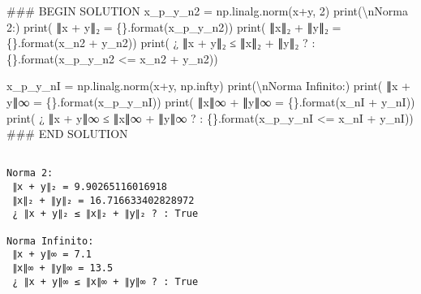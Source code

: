 \documentclass[
  letterpaper,
  DIV=11,
  numbers=noendperiod]{scrreprt}
\newenvironment{Shaded}{\begin{snugshade}}{\end{snugshade}}
\newcommand{\BuiltInTok}[1]{\textcolor[rgb]{0.00,0.23,0.31}{#1}}
\newcommand{\CharTok}[1]{\textcolor[rgb]{0.13,0.47,0.30}{#1}}
\newcommand{\CommentTok}[1]{\textcolor[rgb]{0.37,0.37,0.37}{#1}}
\newcommand{\DecValTok}[1]{\textcolor[rgb]{0.68,0.00,0.00}{#1}}
\newcommand{\NormalTok}[1]{\textcolor[rgb]{0.00,0.23,0.31}{#1}}
\newcommand{\OperatorTok}[1]{\textcolor[rgb]{0.37,0.37,0.37}{#1}}
\newcommand{\RegionMarkerTok}[1]{\textcolor[rgb]{0.00,0.23,0.31}{#1}}
\newcommand{\SpecialCharTok}[1]{\textcolor[rgb]{0.37,0.37,0.37}{#1}}
\newcommand{\StringTok}[1]{\textcolor[rgb]{0.13,0.47,0.30}{#1}}
\begin{document}
\begin{Shaded}
\begin{Highlighting}[]
\CommentTok{\#\#\# }\RegionMarkerTok{BEGIN}\CommentTok{ SOLUTION}
\NormalTok{x\_p\_y\_n2 }\OperatorTok{=}\NormalTok{ np.linalg.norm(x}\OperatorTok{+}\NormalTok{y, }\DecValTok{2}\NormalTok{)}
\BuiltInTok{print}\NormalTok{(}\StringTok{\textquotesingle{}}\CharTok{\textbackslash{}n}\StringTok{Norma 2:\textquotesingle{}}\NormalTok{)}
\BuiltInTok{print}\NormalTok{(}\StringTok{\textquotesingle{} ∥x + y∥₂ = }\SpecialCharTok{\{\}}\StringTok{\textquotesingle{}}\NormalTok{.}\BuiltInTok{format}\NormalTok{(x\_p\_y\_n2))}
\BuiltInTok{print}\NormalTok{(}\StringTok{\textquotesingle{} ∥x∥₂ + ∥y∥₂ = }\SpecialCharTok{\{\}}\StringTok{\textquotesingle{}}\NormalTok{.}\BuiltInTok{format}\NormalTok{(x\_n2 }\OperatorTok{+}\NormalTok{ y\_n2))}
\BuiltInTok{print}\NormalTok{(}\StringTok{\textquotesingle{} ¿ ∥x + y∥₂ ≤ ∥x∥₂ + ∥y∥₂ ? : }\SpecialCharTok{\{\}}\StringTok{\textquotesingle{}}\NormalTok{.}\BuiltInTok{format}\NormalTok{(x\_p\_y\_n2 }\OperatorTok{\textless{}=}\NormalTok{ x\_n2 }\OperatorTok{+}\NormalTok{ y\_n2))}


\NormalTok{x\_p\_y\_nI }\OperatorTok{=}\NormalTok{ np.linalg.norm(x}\OperatorTok{+}\NormalTok{y, np.infty)}
\BuiltInTok{print}\NormalTok{(}\StringTok{\textquotesingle{}}\CharTok{\textbackslash{}n}\StringTok{Norma Infinito:\textquotesingle{}}\NormalTok{)}
\BuiltInTok{print}\NormalTok{(}\StringTok{\textquotesingle{} ∥x + y∥∞ = }\SpecialCharTok{\{\}}\StringTok{\textquotesingle{}}\NormalTok{.}\BuiltInTok{format}\NormalTok{(x\_p\_y\_nI))}
\BuiltInTok{print}\NormalTok{(}\StringTok{\textquotesingle{} ∥x∥∞ + ∥y∥∞ = }\SpecialCharTok{\{\}}\StringTok{\textquotesingle{}}\NormalTok{.}\BuiltInTok{format}\NormalTok{(x\_nI }\OperatorTok{+}\NormalTok{ y\_nI))}
\BuiltInTok{print}\NormalTok{(}\StringTok{\textquotesingle{} ¿ ∥x + y∥∞ ≤ ∥x∥∞ + ∥y∥∞ ? : }\SpecialCharTok{\{\}}\StringTok{\textquotesingle{}}\NormalTok{.}\BuiltInTok{format}\NormalTok{(x\_p\_y\_nI }\OperatorTok{\textless{}=}\NormalTok{ x\_nI }\OperatorTok{+}\NormalTok{ y\_nI))}
\CommentTok{\#\#\# }\RegionMarkerTok{END}\CommentTok{ SOLUTION}
\end{Highlighting}
\end{Shaded}

\begin{verbatim}

Norma 2:
 ∥x + y∥₂ = 9.90265116016918
 ∥x∥₂ + ∥y∥₂ = 16.716633402828972
 ¿ ∥x + y∥₂ ≤ ∥x∥₂ + ∥y∥₂ ? : True

Norma Infinito:
 ∥x + y∥∞ = 7.1
 ∥x∥∞ + ∥y∥∞ = 13.5
 ¿ ∥x + y∥∞ ≤ ∥x∥∞ + ∥y∥∞ ? : True
\end{verbatim}
\end{document}
